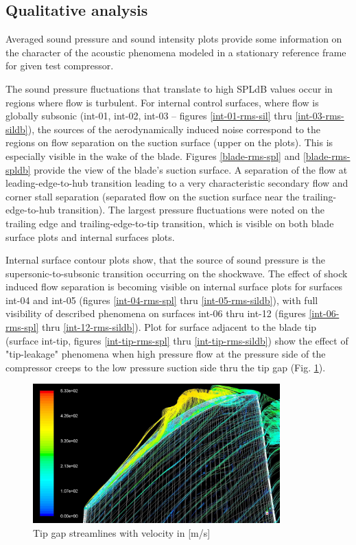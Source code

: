\subsection{Qualitative analysis} \label{rms_res_qual}
Averaged sound pressure and sound intensity plots provide some information on the character of the acoustic phenomena modeled in a stationary reference frame for given test compressor.

The sound pressure fluctuations that translate to high SPLdB values occur in regions where flow is turbulent. For internal control surfaces, where flow is globally subsonic (int-01, int-02, int-03 -- figures \ref{int-01-rms-sil} thru \ref{int-03-rms-sildb}), the sources of the aerodynamically induced noise correspond to the regions on flow separation on the suction surface (upper on the plots). This is especially visible in the wake of the blade. Figures \ref{blade-rms-spl} and \ref{blade-rms-spldb} provide the view of the blade's suction surface. A separation of the flow at leading-edge-to-hub transition leading to a very characteristic secondary flow and corner stall separation (separated flow on the suction surface near the trailing-edge-to-hub transition). The largest pressure fluctuations were noted on the trailing edge and trailing-edge-to-tip transition, which is visible on both blade surface plots and internal surfaces plots.

Internal surface contour plots show, that the source of sound pressure is the supersonic-to-subsonic transition occurring on the shockwave. The effect of shock induced flow separation is becoming visible on internal surface plots for surfaces int-04 and int-05 (figures \ref{int-04-rms-spl} thru \ref{int-05-rms-sildb}), with full visibility of described phenomena on surfaces int-06 thru int-12 (figures \ref{int-06-rms-spl} thru \ref{int-12-rms-sildb}). Plot for surface adjacent to the blade tip (surface int-tip, figures \ref{int-tip-rms-spl} thru \ref{int-tip-rms-sildb}) show the effect of "tip-leakage" phenomena when high pressure flow at the pressure side of the compressor creeps to the low pressure suction side thru the tip gap (Fig. \ref{tip_stream}). 

\begin{figure}[h!]
\centering %
\includegraphics[width=0.85\textwidth]{Pictures/tip_stream.jpg}
\caption{Tip gap streamlines with velocity in [m/s]}
\label{tip_stream}
\end{figure}

